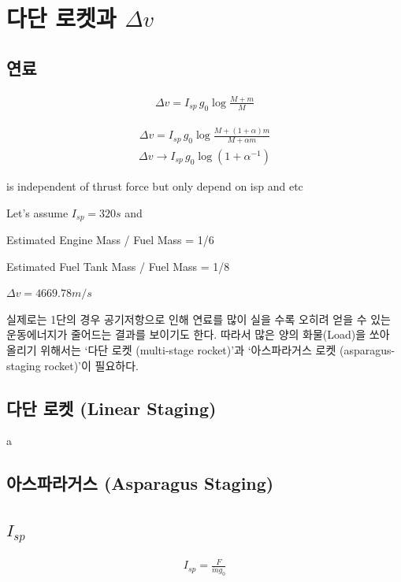 \documentclass[9pt]{amsbook}
\begin{document}
\chapter{다단 로켓과 $\Delta v$}
\section{연료}

\begin{align}
    \Delta v =I_{sp}\, g_0\log\frac{M+m}{M}
\end{align}

\begin{align}
    \Delta v = I_{sp}\, g_0\log\frac{M+(1+\alpha) m}{M+\alpha m}
\end{align}
\begin{align}
    \Delta v \rightarrow I_{sp}\, g_0\log(1+\alpha^{-1})
\end{align}

is independent of thrust force but only depend on isp and etc

Let's assume $I_{sp} =320 s$ and 

Estimated Engine Mass / Fuel Mass = 1/6

Estimated Fuel Tank Mass / Fuel Mass = 1/8

$\Delta v = 4669.78 m/s$

실제로는 1단의 경우 공기저항으로 인해 연료를 많이 실을 수록 오히려 얻을 수 있는 운동에너지가 줄어드는 결과를 보이기도 한다. 따라서 많은 양의 화물(Load)을 쏘아 올리기 위해서는 `다단 로켓 (multi-stage rocket)'과 `아스파라거스 로켓 (asparagus-staging rocket)'이 필요하다.


\section{다단 로켓 (Linear Staging)}
a


\section{아스파라거스 (Asparagus Staging)}

\section{$I_{sp}$}
\begin{align}
I_{sp} = \frac{F}{\dot{m}g_0}
\end{align}
\end{document}
